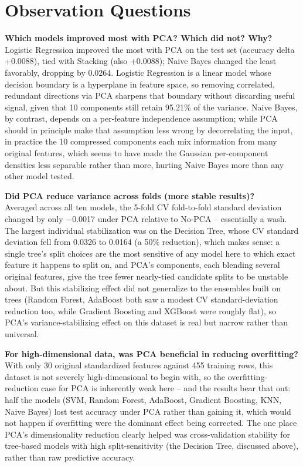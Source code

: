 \documentclass[11pt,a4paper]{article}
\begin{document}
\section{Observation Questions}

\textbf{Which models improved most with PCA? Which did not? Why?}\\
Logistic Regression improved the most with PCA on the test set (accuracy delta +0.0088), tied with Stacking (also +0.0088); Naive Bayes changed the least favorably, dropping by 0.0264. Logistic Regression is a linear model whose decision boundary is a hyperplane in feature space, so removing correlated, redundant directions via PCA sharpens that boundary without discarding useful signal, given that 10 components still retain 95.21\% of the variance. Naive Bayes, by contrast, depends on a per-feature independence assumption; while PCA should in principle make that assumption less wrong by decorrelating the input, in practice the 10 compressed components each mix information from many original features, which seems to have made the Gaussian per-component densities less separable rather than more, hurting Naive Bayes more than any other model tested.

\textbf{Did PCA reduce variance across folds (more stable results)?}\\
Averaged across all ten models, the 5-fold CV fold-to-fold standard deviation changed by only $-$0.0017 under PCA relative to No-PCA -- essentially a wash. The largest individual stabilization was on the Decision Tree, whose CV standard deviation fell from 0.0326 to 0.0164 (a 50\% reduction), which makes sense: a single tree's split choices are the most sensitive of any model here to which exact feature it happens to split on, and PCA's components, each blending several original features, give the tree fewer nearly-tied candidate splits to be unstable about. But this stabilizing effect did not generalize to the ensembles built on trees (Random Forest, AdaBoost both saw a modest CV standard-deviation reduction too, while Gradient Boosting and XGBoost were roughly flat), so PCA's variance-stabilizing effect on this dataset is real but narrow rather than universal.

\textbf{For high-dimensional data, was PCA beneficial in reducing overfitting?}\\
With only 30 original standardized features against 455 training rows, this dataset is not severely high-dimensional to begin with, so the overfitting-reduction case for PCA is inherently weak here -- and the results bear that out: half the models (SVM, Random Forest, AdaBoost, Gradient Boosting, KNN, Naive Bayes) lost test accuracy under PCA rather than gaining it, which would not happen if overfitting were the dominant effect being corrected. The one place PCA's dimensionality reduction clearly helped was cross-validation stability for tree-based models with high split-sensitivity (the Decision Tree, discussed above), rather than raw predictive accuracy.
\end{document}
